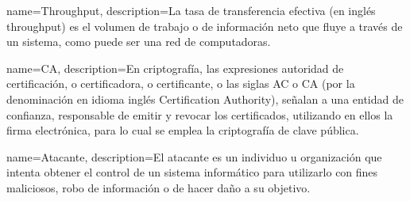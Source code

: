 

{
    name=Throughput,
    description={La tasa de transferencia efectiva (en inglés throughput) es el volumen de trabajo o de información neto que fluye a través de
    un sistema, como puede ser una red de computadoras.}~\cite[Wikipedia]{wikithroughput}
}

{
    name=CA,
    description={En criptografía, las expresiones autoridad de certificación, o certificadora, o certificante, o las siglas AC o CA (por la
    denominación en idioma inglés Certification Authority), señalan a una entidad de confianza, responsable de emitir y revocar los certificados,
    utilizando en ellos la firma electrónica, para lo cual se emplea la criptografía de clave pública.}~\cite[Wikipedia]{CA}
}

{
    name=Atacante,
    description={El atacante es un individuo u organización que intenta obtener el control de un sistema informático para utilizarlo con fines
    maliciosos, robo de información o de hacer daño a su objetivo.}~\cite[Wikipedia]{Atacante}
}

